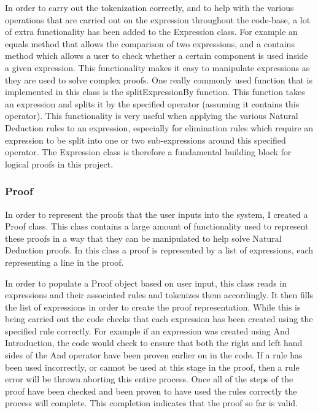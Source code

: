 In order to carry out the tokenization correctly, and to help with the various operations that are carried out on the expression throughout the code-base, a lot of extra functionality has been added to the Expression class. For example an equals method that allows the comparison of two expressions, and a contains method which allows a user to check whether a certain component is used inside a given expression. This functionality makes it easy to manipulate expressions as they are used to solve complex proofs. One really commonly used function that is implemented in this class is the splitExpressionBy function. This function takes an expression and splits it by the specified operator (assuming it contains this operator). This functionality is very useful when applying the various Natural Deduction rules to an expression, especially for elimination rules which require an expression to be split into one or two sub-expressions around this specified operator. The Expression class is therefore a fundamental building block for logical proofs in this project.

\subsubsection{Proof}

In order to represent the proofs that the user inputs into the system, I created a Proof class. This class contains a large amount of functionality used to represent these proofs in a way that they can be manipulated to help solve Natural Deduction proofs. In this class a proof is represented by a list of expressions, each representing a line in the proof. 

In order to populate a Proof object based on user input, this class reads in expressions and their associated rules and tokenizes them accordingly. It then fills the list of expressions in order to create the proof representation. While this is being carried out the code checks that each expression has been created using the specified rule correctly. For example if an expression was created using And Introduction, the code would check to ensure that both the right and left hand sides of the And operator have been proven earlier on in the code. If a rule has been used incorrectly, or cannot be used at this stage in the proof, then a rule error will be thrown aborting this entire process. Once all of the steps of the proof have been checked and been proven to have used the rules correctly the process will complete. This completion indicates that the proof so far is valid. 

